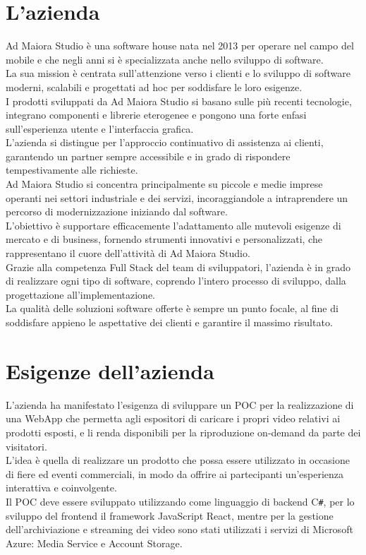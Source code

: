 \clearpage
\section{L'azienda}

Ad Maiora Studio è una software house nata nel 2013 per operare nel campo del mobile e che negli anni si è specializzata anche nello sviluppo di software.\\
La sua mission è centrata sull'attenzione verso i clienti e lo sviluppo di software moderni, scalabili e progettati ad hoc per soddisfare le loro esigenze. \\
I prodotti sviluppati da Ad Maiora Studio si basano sulle più recenti tecnologie, integrano componenti e librerie eterogenee e pongono una forte enfasi sull'esperienza utente
 e l'interfaccia grafica.\\
L'azienda si distingue per l'approccio continuativo di assistenza ai clienti, 
garantendo un partner sempre accessibile e in grado di rispondere tempestivamente alle richieste. \\
Ad Maiora Studio si concentra principalmente su piccole e medie imprese operanti nei settori industriale e dei servizi, incoraggiandole a intraprendere un percorso di modernizzazione
 iniziando dal software.\\
L'obiettivo è supportare efficacemente l'adattamento alle mutevoli esigenze di mercato e di business, fornendo strumenti innovativi e personalizzati, che rappresentano il cuore dell'attività di Ad Maiora Studio.\\
Grazie alla competenza Full Stack del team di sviluppatori, l'azienda è in grado di realizzare ogni tipo di software, 
coprendo l'intero processo di sviluppo, dalla progettazione all'implementazione.\\
La qualità delle soluzioni software offerte è sempre un punto focale, al fine di soddisfare appieno le aspettative dei clienti e garantire il massimo risultato.

\section{Esigenze dell'azienda}

L'azienda ha manifestato l'esigenza di sviluppare un POC per la realizzazione di una WebApp che permetta agli espositori di caricare i propri video relativi ai prodotti esposti, e li renda disponibili per la riproduzione on-demand da parte dei visitatori.\\
L'idea è quella di realizzare un prodotto che possa essere utilizzato in occasione di fiere ed eventi commerciali, in modo da offrire ai partecipanti un'esperienza interattiva e coinvolgente.\\
Il POC deve essere sviluppato utilizzando come linguaggio di backend C\texttt{\#}, per lo sviluppo del frontend il framework JavaScript React, mentre per la gestione dell'archiviazione e streaming dei video sono stati utilizzati i servizi di Microsoft Azure: Media Service e Account Storage.\\

